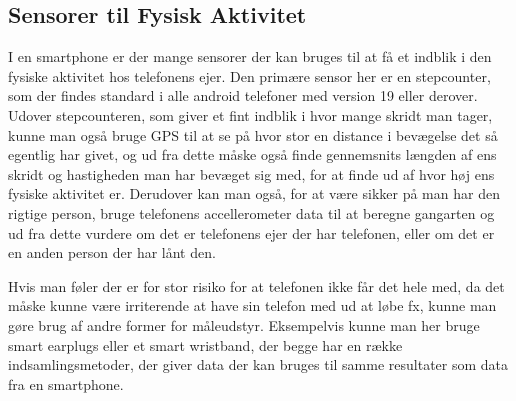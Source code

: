 \subsection{Sensorer til Fysisk Aktivitet}
I en smartphone er der mange sensorer der kan bruges til at få et indblik i den fysiske aktivitet hos telefonens ejer.
Den primære sensor her er en stepcounter, som der findes standard i alle android telefoner med version 19 eller derover.
Udover stepcounteren, som giver et fint indblik i hvor mange skridt man tager, kunne man også bruge GPS til at se på hvor stor en distance i bevægelse det så egentlig har givet, og ud fra dette måske også finde gennemsnits længden af ens skridt og hastigheden man har bevæget sig med, for at finde ud af hvor høj ens fysiske aktivitet er.
Derudover kan man også, for at være sikker på man har den rigtige person, bruge telefonens accellerometer data til at beregne gangarten og ud fra dette vurdere om det er telefonens ejer der har telefonen, eller om det er en anden person der har lånt den.

Hvis man føler der er for stor risiko for at telefonen ikke får det hele med, da det måske kunne være irriterende at have sin telefon med ud at løbe fx, kunne man gøre brug af andre former for måleudstyr.
Eksempelvis kunne man her bruge smart earplugs eller et smart wristband, der begge har en række indsamlingsmetoder, der giver data der kan bruges til samme resultater som data fra en smartphone.

